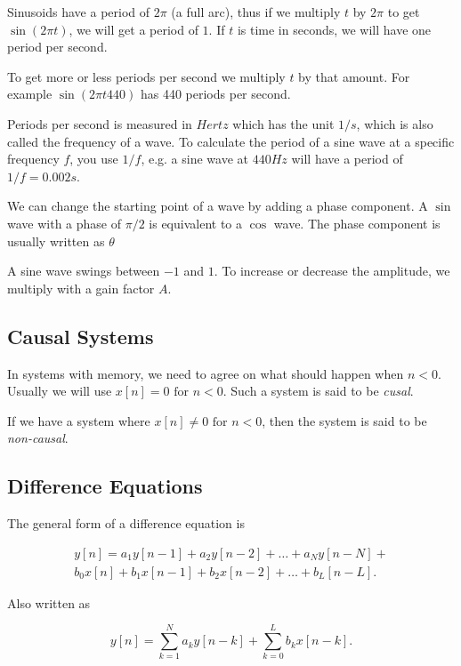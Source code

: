 \documentclass{article}
\def\lsqb{\left[}
\def\rsqb{\right]}
\def\sqb#1{\lsqb #1 \rsqb}
\begin{document}
Sinusoids have a period of $2 \pi$ (a full arc), thus if we multiply $t$ by $2\pi$ to get $\sin(2 \pi t)$, we will get a period of $1$. If $t$ is time in seconds, we will have one period per second.

To get more or less periods per second we multiply $t$ by that amount. For example $\sin(2 \pi t 440)$ has 440 periods per second.

Periods per second is measured in $Hertz$ which has the unit $1/s$, which is also called the frequency of a wave. To calculate the period of a sine wave at a specific frequency $f$, you use $1/f$, e.g. a sine wave at $440Hz$ will have a period of $1/f=0.002s$.

We can change the starting point of a wave by adding a phase component. A $\sin$ wave with a phase of $\pi/2$ is equivalent to a $\cos$ wave. The phase component is usually written as $\theta$

A sine wave swings between $-1$ and $1$. To increase or decrease the amplitude, we multiply with a gain factor $A$.

\subsection{Causal Systems}
In systems with memory, we need to agree on what should happen when $n < 0$. Usually we will use $x\left[n\right] = 0 \text{ for } n < 0$. Such a system is said to be \textit{cusal}.

If we have a system where $x\left[n\right] \neq 0 \text{ for } n < 0$, then the system is said to be \textit{non-causal}.

\subsection{Difference Equations}
The general form of a difference equation is

\begin{equation}
\begin{split}
    y\sqb{n} = a_1 y\sqb{n - 1} + a_2 y\sqb{n-2} + \dots + a_N y\sqb{n-N} + \\
        b_0 x\sqb{n} + b_1 x\sqb{n - 1} + b_2 x\sqb{n - 2} + \dots + b_L\sqb{n - L}.
\end{split}
\end{equation}

Also written as

\begin{equation}
    y\sqb{n} = \sum_{k=1}^N a_k y\sqb{n - k} + \sum_{k=0}^L b_k x\sqb{n - k}.
\end{equation}
\end{document}
